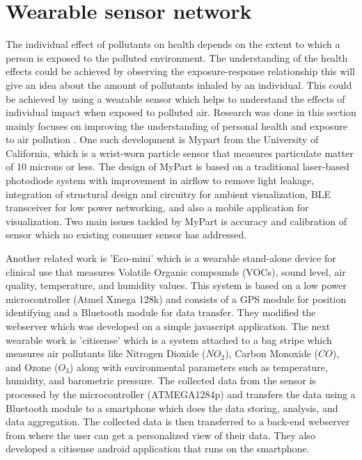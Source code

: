 \section{Wearable sensor network}


The individual effect of pollutants on health depends on the extent to which a person is exposed to the polluted environment. The understanding of the health effects could be achieved by observing the exposure-response relationship \cite{Dons2017} this will give an idea about the amount of pollutants inhaled by an individual. This could be achieved by using a wearable sensor which helps to understand the effects of individual impact when exposed to polluted air. Research was done in this section mainly focuses on improving the understanding of personal health and exposure to air pollution \cite{Hu2015}. One such development is Mypart \cite{Tian2016}  from the University of California, which is a wrist-worn particle sensor that measures particulate matter of 10 microns or less.  The design of MyPart is based on a traditional laser-based photodiode system with improvement in airflow to remove light leakage, integration of structural design and circuitry for ambient visualization, BLE transceiver for low power networking, and also a mobile application for visualization. Two main issues tackled by MyPart is accuracy and calibration of sensor which no existing consumer sensor has addressed.

Another related work is 'Eco-mini'\cite{Fletcher2015} which is a wearable stand-alone device for clinical use that measures Volatile Organic compounds (VOCs), sound level, air quality, temperature, and humidity values. This system is based on a low power microcontroller (Atmel Xmega 128k) and consists of a GPS module for position identifying and a Bluetooth module for data transfer. They modified the webserver which was developed on a simple javascript application. The next wearable work is 'citisense' \cite{Zappi2012} which is a system attached to a bag stripe which measures air pollutants like Nitrogen Dioxide ($NO_2$), Carbon Monoxide ($CO$), and Ozone  ($O_3$) along with environmental parameters such as temperature, humidity, and barometric pressure. The collected data from the sensor is processed by the microcontroller (ATMEGA1284p) and transfers the data using a Bluetooth module to a smartphone which does the data storing, analysis, and data aggregation. The collected data is then transferred to a back-end webserver from where the user can get a personalized view of their data. They also developed a citisense android application that runs on the smartphone.
 
